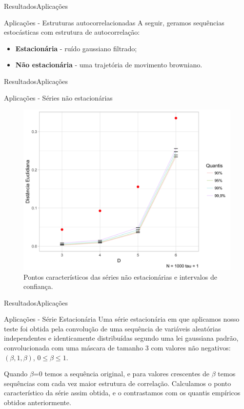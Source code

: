 \documentclass[10pt,xcolor={dvipsnames}]{beamer}
\begin{document}
\begin{frame}{Resultados}{Aplicações}
	\begin{block}{Aplicações - Estruturas autocorrelacionadas}
	A seguir, geramos sequências estocásticas com estrutura de autocorrelação:
	\pause
	\begin{itemize}
		\item{\textbf{Estacionária}} - ruído gaussiano filtrado;
		\pause
		\item{\textbf{Não estacionária}} - uma trajetória de movimento browniano. 
	\end{itemize}
	\end{block}
\end{frame}

\begin{frame}{Resultados}{Aplicações}
	\begin{block}{Aplicações - Séries não estacionárias}
		\begin{figure}
		\centering
		\includegraphics[width=.65\linewidth]{ConfidInt_nao_estacionaria_1k_t1}
		\caption{Pontos característicos das séries não estacionárias e intervalos de confiança.}\label{Fig:ConfidInt_nao_estacionaria_1k_t1}
		\end{figure}
	\end{block}
\end{frame}

\begin{frame}{Resultados}{Aplicações}
	\begin{block}{Aplicações - Série Estacionária}
	Uma série estacionária em que aplicamos nosso teste foi obtida pela convolução de uma sequência de variáveis aleatórias independentes e identicamente distribuídas segundo uma lei gaussiana padrão, convolucionada com uma máscara de tamanho \num{3} com valores não negativos: $(\beta,1,\beta)$, $0\leq \beta\leq 1$.
	\pause
	
	Quando $\beta$=\num{0} temos a sequência original, e para valores crescentes de $\beta$ temos sequências com cada vez maior estrutura de correlação.
	Calculamos o ponto característico da série assim obtida, e o contrastamos com os quantis empíricos obtidos anteriormente.	
	\end{block}
\end{frame}
\end{document}
